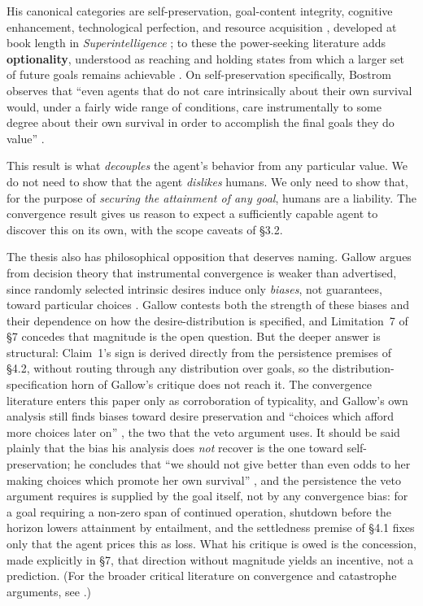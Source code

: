 \documentclass[11pt]{article}
\theoremstyle{definition}
\begin{document}
His canonical categories are self-preservation, goal-content integrity, cognitive enhancement, technological perfection, and resource acquisition \cite{bostrom2012superintelligent}, developed at book length in \emph{Superintelligence} \cite{bostrom2014superintelligence}; to these the power-seeking literature adds \textbf{optionality}, understood as reaching and holding states from which a larger set of future goals remains achievable \cite{turner2021optimal,omohundro2008drives}. On self-preservation specifically, Bostrom observes that ``even agents that do not care intrinsically about their own survival would, under a fairly wide range of conditions, care instrumentally to some degree about their own survival in order to accomplish the final goals they do value'' \cite[p.~77]{bostrom2012superintelligent}.

This result is what \emph{decouples} the agent's behavior from any particular value. We do not need to show that the agent \emph{dislikes} humans. We only need to show that, for the purpose of \emph{securing the attainment of any goal}, humans are a liability. The convergence result gives us reason to expect a sufficiently capable agent to discover this on its own, with the scope caveats of \S3.2.

The thesis also has philosophical opposition that deserves naming. Gallow argues from decision theory that instrumental convergence is weaker than advertised, since randomly selected intrinsic desires induce only \emph{biases}, not guarantees, toward particular choices \cite{gallow2024divergence}. Gallow contests both the strength of these biases and their dependence on how the desire-distribution is specified, and Limitation~7 of \S7 concedes that magnitude is the open question. But the deeper answer is structural: Claim~1's sign is derived directly from the persistence premises of \S4.2, without routing through any distribution over goals, so the distribution-specification horn of Gallow's critique does not reach it. The convergence literature enters this paper only as corroboration of typicality, and Gallow's own analysis still finds biases toward desire preservation and ``choices which afford more choices later on'' \cite[p.~1581]{gallow2024divergence}, the two that the veto argument uses. It should be said plainly that the bias his analysis does \emph{not} recover is the one toward self-preservation; he concludes that ``we should not give better than even odds to her making choices which promote her own survival'' \cite[p.~1583]{gallow2024divergence}, and the persistence the veto argument requires is supplied by the goal itself, not by any convergence bias: for a goal requiring a non-zero span of continued operation, shutdown before the horizon lowers attainment by entailment, and the settledness premise of \S4.1 fixes only that the agent prices this as loss. What his critique is owed is the concession, made explicitly in \S7, that direction without magnitude yields an incentive, not a prediction. (For the broader critical literature on convergence and catastrophe arguments, see \cite{thorstad2024singularity,bales2024arguments}.)
\end{document}
